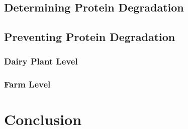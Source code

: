 \subsection{Determining Protein Degradation}

\subsection{Preventing Protein Degradation}

\subsubsection{Dairy Plant Level}

\subsubsection{Farm Level}



\section{Conclusion}

